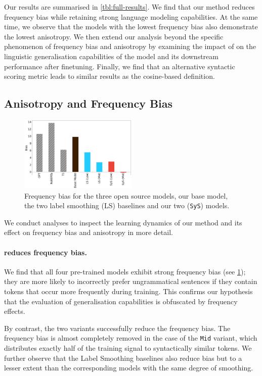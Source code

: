 Our results are summarised in \cref{tbl:full-results}. We find that our method reduces frequency bias while retaining strong language modeling capabilities. At the same time, we observe that the models with the lowest frequency bias also demonstrate the lowest anisotropy. We then extend our analysis beyond the specific phenomenon of frequency bias and anisotropy by examining the impact of \smoothing on the linguistic generalisation capabilities of the model and its downstream performance after finetuning. Finally, we find that an alternative syntactic scoring metric leads to similar results as the cosine-based definition.

\subsection{Anisotropy and Frequency Bias}

\begin{figure}
    \centering
    \includegraphics[width=0.5\textwidth]{chapters/syntatic-smoothing/figures/biases.png}
    \caption{Frequency bias for the three open source models, our base model, the two label smoothing (LS) baselines and our two \smoothing (\texttt{SyS}) models.}
    \label{fig:biases}
\end{figure}

We conduct analyses to inspect the learning dynamics of our method and its effect on frequency bias and anisotropy in more detail. 

\paragraph{\smoothing reduces frequency bias.}
We find that all four pre-trained models exhibit strong frequency bias (see \cref{fig:biases}); they are more likely to incorrectly prefer ungrammatical sentences if they contain tokens that occur more frequently during training. This confirms our hypothesis that the evaluation of generalisation capabilities is obfuscated by frequency effects. 

By contrast, the two \smoothing variants successfully reduce the frequency bias. The frequency bias is almost completely removed in the case of the \texttt{Mid} variant, which distributes exactly half of the training signal to syntactically similar tokens. We further observe that the Label Smoothing baselines also reduce bias but to a lesser extent than the corresponding \smoothing models with the same degree of smoothing. 


